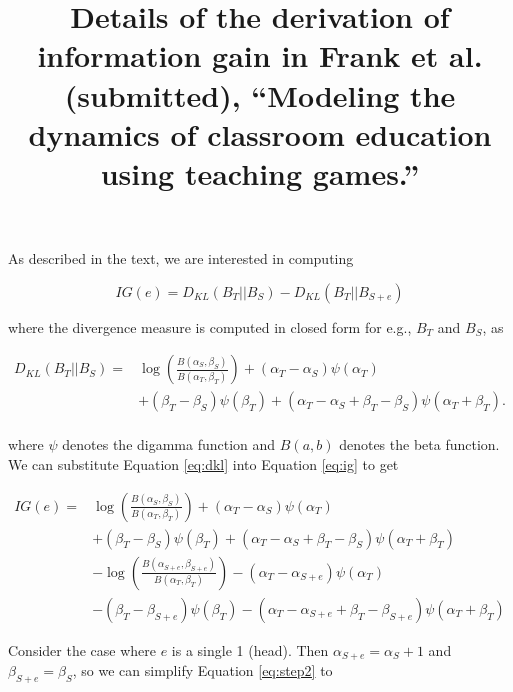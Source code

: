 \documentclass[12pt]{article}
\title{Details of the derivation of information gain in Frank et al. (submitted), ``Modeling the dynamics of classroom education using teaching games.''}
\date{}
\begin{document}
\maketitle

As described in the text, we are interested in computing

\begin{equation}
\label{eq:ig}
IG(e) = D_{KL} ( B_T || B_{S} )  - D_{KL} (B_T ||B_{S+e} ) 
\end{equation}

\noindent where the divergence measure is computed in closed form for e.g., $B_T$ and $B_S$, as

\begin{equation}
\label{eq:dkl}
\begin{split}
D_{KL} (B_T ||B_{S} )  = & \log( \frac{B(\alpha_{S},\beta_{S})}{B(\alpha_{T},\beta_{T})}) +  (\alpha_T - \alpha_S) \psi (\alpha_T) \\ 
& + (\beta_T - \beta_S) \psi (\beta_T) +  (\alpha_T - \alpha_S + \beta_T - \beta_S) \psi (\alpha_T + \beta_T). \\
\end{split}
\end{equation}

\noindent where $\psi$ denotes the digamma function and $B(a,b)$ denotes the beta function. We can substitute Equation \ref{eq:dkl} into Equation \ref{eq:ig} to get

\begin{equation}
\begin{split}
IG(e)  = & \log( \frac{B(\alpha_{S},\beta_{S})}{B(\alpha_{T},\beta_{T})}) + (\alpha_T - \alpha_S) \psi (\alpha_T)  \\ 
& + (\beta_T - \beta_S) \psi (\beta_T) +  (\alpha_T - \alpha_S + \beta_T - \beta_S) \psi (\alpha_T + \beta_T)  \\
& - \log( \frac{B(\alpha_{S+e},\beta_{S+e})}{B(\alpha_{T},\beta_{T})}) - (\alpha_T - \alpha_{S+e}) \psi (\alpha_T) \\ 
& - (\beta_T - \beta_{S+e}) \psi (\beta_T) - (\alpha_T - \alpha_{S+e} + \beta_T - \beta_{S+e}) \psi (\alpha_T + \beta_T)
\end{split}
\label{eq:step2}
\end{equation}

Consider the case where $e$ is a single 1 (head). Then $\alpha_{S+e}= \alpha_S + 1$ and $\beta_{S+e}= \beta_{S}$, so we can simplify Equation \ref{eq:step2} to
\end{document}
